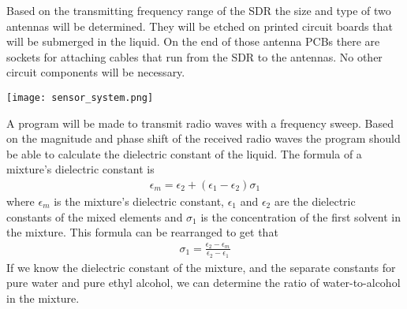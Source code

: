 Based on the transmitting frequency range of the SDR the size and type of two antennas will be determined.
They will be etched on printed circuit boards that will be submerged in the liquid.
On the end of those antenna PCBs there are sockets for attaching cables that run from the SDR to the antennas.
No other circuit components will be necessary.

\begin{center}
    \texttt{[image: sensor\_system.png]}
\end{center}

A program will be made to transmit radio waves with a frequency sweep.
Based on the magnitude and phase shift of the received radio waves the program should be able to calculate the dielectric constant of the liquid.
The formula of a mixture's dielectric constant is
\begin{align}
    \epsilon_m = \epsilon_2 + \left( \epsilon_1 - \epsilon_2 \right) \sigma_1
\end{align}
where $\epsilon_m$ is the mixture's dielectric constant, $\epsilon_1$ and $\epsilon_2$ are the dielectric constants of the mixed elements and $\sigma_1$ is the concentration of the first solvent in the mixture.
This formula can be rearranged to get that
\begin{align}
    \sigma_1 = \frac{\epsilon_2 - \epsilon_m}{\epsilon_2 - \epsilon_1}
\end{align}
If we know the dielectric constant of the mixture, and the separate constants for pure water and pure ethyl alcohol, we can determine the ratio of water-to-alcohol in the mixture.